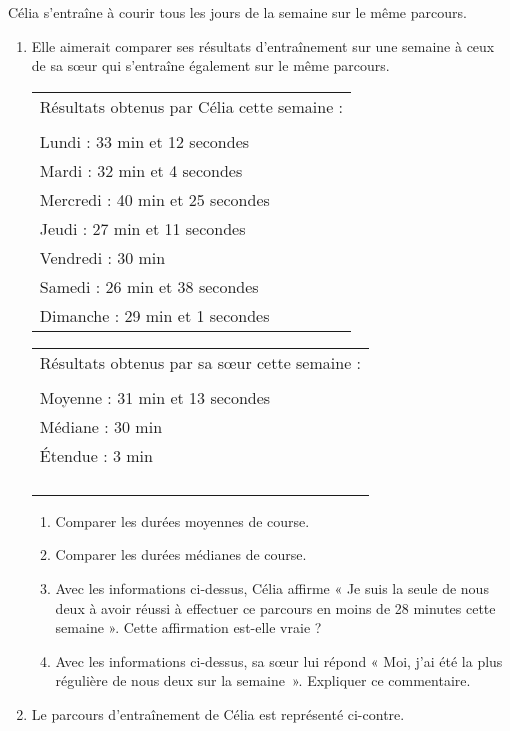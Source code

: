 Célia s'entraîne à courir tous les jours de la semaine sur le même parcours.
\begin{enumerate}
    \item Elle aimerait comparer ses résultats d'entraînement sur une semaine à ceux de sa s\oe ur qui s’entraîne également sur le même parcours.
    
    \medskip
	\noindent\begin{tabularx}{0.4\linewidth}{|X|}
        \hline 		
        Résultats obtenus par Célia cette semaine :\\
        \\
        Lundi : 33 min et 12 secondes\\
        Mardi : 32 min et 4 secondes\\
        Mercredi : 40 min et 25 secondes\\
        Jeudi : 27 min et 11 secondes\\
        Vendredi : 30 min\\
        Samedi : 26 min et 38 secondes\\
        Dimanche : 29 min et 1 secondes\\
        \hline 
    \end{tabularx}
    \hspace{1cm}
    \noindent\begin{tabularx}{0.45\linewidth}{|X|}
        \hline 		
        Résultats obtenus par sa s\oe ur cette semaine :\\
        \\
        Moyenne : 31 min et 13 secondes\\
        Médiane : 30 min\\
        Étendue : 3 min\\
        \\
        \\
        \\
        \\
        \hline 
    \end{tabularx}
    \medskip
    \begin{enumerate}
        \item Comparer les durées moyennes de course.
        \item Comparer les durées médianes de course.
        \item Avec les informations ci-dessus, Célia affirme « Je suis la seule de nous deux à avoir
        réussi à effectuer ce parcours en moins de 28 minutes cette semaine ». Cette affirmation est-elle vraie ?
        \item Avec les informations ci-dessus, sa s\oe ur lui répond « Moi, j’ai été la plus régulière de
        nous deux sur la semaine~». Expliquer ce commentaire.
    \end{enumerate}
    \item Le parcours d’entraînement de Célia est représenté ci-contre.
    

\end{enumerate}
